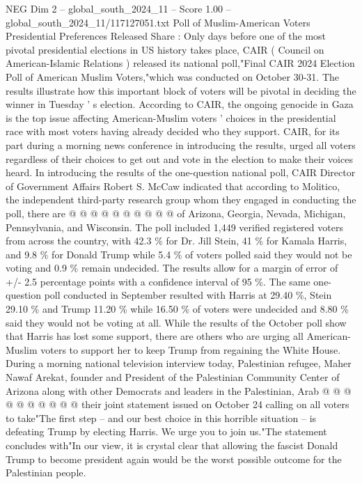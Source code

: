 \begin{textsample}{NEG Dim 2 – global\_south\_2024\_11 – Score 1.00 – global\_south\_2024\_11/117127051.txt}  \label{ex:f2_neg_200}
Poll of Muslim-American Voters Presidential Preferences Released Share : Only days before one of the most pivotal presidential elections in US history takes place, CAIR ( Council on American-Islamic Relations ) released its national poll,"Final CAIR 2024 Election Poll of American Muslim Voters,"which was conducted on October 30-31.
The results illustrate how this important block of voters will be pivotal in deciding the winner in Tuesday ' s election.
According to CAIR, the ongoing genocide in Gaza is the top issue affecting American-Muslim voters ' choices in the presidential race with most voters having already decided who they support.
CAIR, for its part during a morning news conference in introducing the results, urged all voters regardless of their choices to get out and vote in the election to make their voices heard.
In introducing the results of the one-question national poll, CAIR Director of Government Affairs Robert S.
McCaw indicated that according to Molitico, the independent third-party research group whom they engaged in conducting the poll, there are @ @ @ @ @ @ @ @ @ @ of Arizona, Georgia, Nevada, Michigan, Pennsylvania, and Wisconsin.
The poll included 1,449 verified registered voters from across the country, with 42.3 \% for Dr.
Jill Stein, 41 \% for Kamala Harris, and 9.8 \% for Donald Trump while 5.4 \% of voters polled said they would not be voting and 0.9 \% remain undecided.
The results allow for a margin of error of +/- 2.5 percentage points with a confidence interval of 95 \%.
The same one-question poll conducted in September resulted with Harris at 29.40 \%, Stein 29.10 \% and Trump 11.20 \% while 16.50 \% of voters were undecided and 8.80 \% said they would not be voting at all.
While the results of the October poll show that Harris has lost some support, there are others who are urging all American-Muslim voters to support her to keep Trump from regaining the White House.
During a morning national television interview today, Palestinian refugee, Maher Nawaf Arekat, founder and President of the Palestinian Community Center of Arizona along with other Democrats and leaders in the Palestinian, Arab @ @ @ @ @ @ @ @ @ @ their joint statement issued on October 24 calling on all voters to take"The first step -- and our best choice in this horrible situation -- is defeating Trump by electing Harris.
We urge you to join us."The statement concludes with"In our view, it is crystal clear that allowing the fascist Donald Trump to become president again would be the worst possible outcome for the Palestinian people.

\end{textsample}
